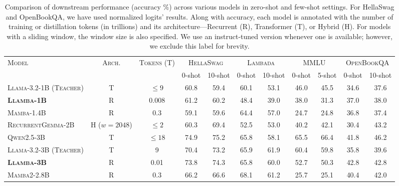\begin{table}[H]
    \small
    \setlength{\tabcolsep}{3.5pt}
    \centering
    \caption{
    Comparison of downstream performance (accuracy \%) across various models in zero-shot and few-shot settings. For HellaSwag and OpenBookQA, we have used normalized logits' results.
    Along with accuracy, each model is annotated with the number of training or distillation tokens (in trillions) and its architecture—Recurrent (R), Transformer (T), or Hybrid (H). For models with a sliding window, the window size is also specified.
    We use an instruct-tuned version whenever one is available; however, we exclude this label for brevity.
    }
    \label{tab:performance_comparison_2}
    \begin{tabular}{l c c c c c c c c c c}
        \toprule
        \multirow{2}{*}{\textsc{Model}} 
         & \multirow{2}{*}{\textsc{Arch.}} 
         & \multirow{2}{*}{\textsc{Tokens (T)}}  
         & \multicolumn{2}{c}{\textsc{HellaSwag}} 
         & \multicolumn{2}{c}{\textsc{Lambada}} 
         & \multicolumn{2}{c}{\textsc{MMLU}} 
         & \multicolumn{2}{c}{\textsc{OpenBookQA}} \\
        \cmidrule(r){4-5} \cmidrule(r){6-7} \cmidrule(r){8-9} \cmidrule(r){10-11}
         & & & 0-shot & 10-shot & 0-shot & 10-shot & 0-shot & 5-shot & 0-shot & 10-shot \\
        \midrule
        \textsc{Llama-3.2-1B (Teacher)} & T & $\leq 9$    & 60.8 & 59.4 & 60.1 & 53.1 & 46.0 & 45.5 & 34.6 & 37.6 \\
        \textbf{\textsc{Llamba-1B}}      & R & 0.008       & 61.2 & 60.2 & 48.4 & 39.0 & 38.0 & 31.3 & 37.0 & 38.0 \\
        \textsc{Mamba-1.4B}             & R & 0.3         & 59.1 & 59.6 & 64.4 & 57.0 & 24.7 & 24.8 & 36.8 & 37.4 \\
        \textsc{RecurrentGemma-2B}      & H ($w=2048$) & $\leq 2$  & 60.3 & 69.4 & 52.5 & 53.0 & 40.2 & 42.1 & 30.4 & 43.2 \\
        
        \midrule

        \textsc{Qwen2.5-3B}             & T & $\leq 18$   & 74.9 & 75.2 & 65.8 & 58.1 & 65.5 & 66.4 & 41.8 & 46.2 \\
        \textsc{Llama-3.2-3B (Teacher)} & T & 9           & 70.4 & 73.2 & 65.9 & 61.9 & 60.4 & 59.8 & 35.8 & 39.6 \\
        \textbf{\textsc{Llamba-3B}}      & R & 0.01        & 73.8 & 74.3 & 65.8 & 60.0 & 52.7 & 50.3 & 42.8 & 42.8 \\
        \textsc{Mamba2-2.8B}            & R & 0.3         & 66.2 & 66.6 & 68.1 & 61.2 & 25.7 & 25.1 & 40.4 & 42.0 \\
        

\end{tabular}
\end{table}
